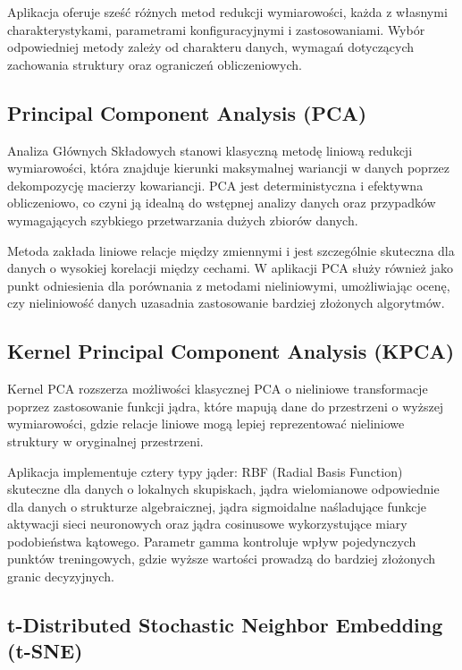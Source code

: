 \documentclass[a4paper, 12pt]{article}
\begin{document}
Aplikacja oferuje sześć różnych metod redukcji wymiarowości, każda z własnymi charakterystykami, parametrami konfiguracyjnymi i zastosowaniami. Wybór odpowiedniej metody zależy od charakteru danych, wymagań dotyczących zachowania struktury oraz ograniczeń obliczeniowych.

\subsection{Principal Component Analysis (PCA)}

Analiza Głównych Składowych stanowi klasyczną metodę liniową redukcji wymiarowości, która znajduje kierunki maksymalnej wariancji w danych poprzez dekompozycję macierzy kowariancji. PCA jest deterministyczna i efektywna obliczeniowo, co czyni ją idealną do wstępnej analizy danych oraz przypadków wymagających szybkiego przetwarzania dużych zbiorów danych.

Metoda zakłada liniowe relacje między zmiennymi i jest szczególnie skuteczna dla danych o wysokiej korelacji między cechami. W aplikacji PCA służy również jako punkt odniesienia dla porównania z metodami nieliniowymi, umożliwiając ocenę, czy nieliniowość danych uzasadnia zastosowanie bardziej złożonych algorytmów.

\subsection{Kernel Principal Component Analysis (KPCA)}

Kernel PCA rozszerza możliwości klasycznej PCA o nieliniowe transformacje poprzez zastosowanie funkcji jądra, które mapują dane do przestrzeni o wyższej wymiarowości, gdzie relacje liniowe mogą lepiej reprezentować nieliniowe struktury w oryginalnej przestrzeni.

Aplikacja implementuje cztery typy jąder: RBF (Radial Basis Function) skuteczne dla danych o lokalnych skupiskach, jądra wielomianowe odpowiednie dla danych o strukturze algebraicznej, jądra sigmoidalne naśladujące funkcje aktywacji sieci neuronowych oraz jądra cosinusowe wykorzystujące miary podobieństwa kątowego. Parametr gamma kontroluje wpływ pojedynczych punktów treningowych, gdzie wyższe wartości prowadzą do bardziej złożonych granic decyzyjnych.

\subsection{t-Distributed Stochastic Neighbor Embedding (t-SNE)}
\end{document}
